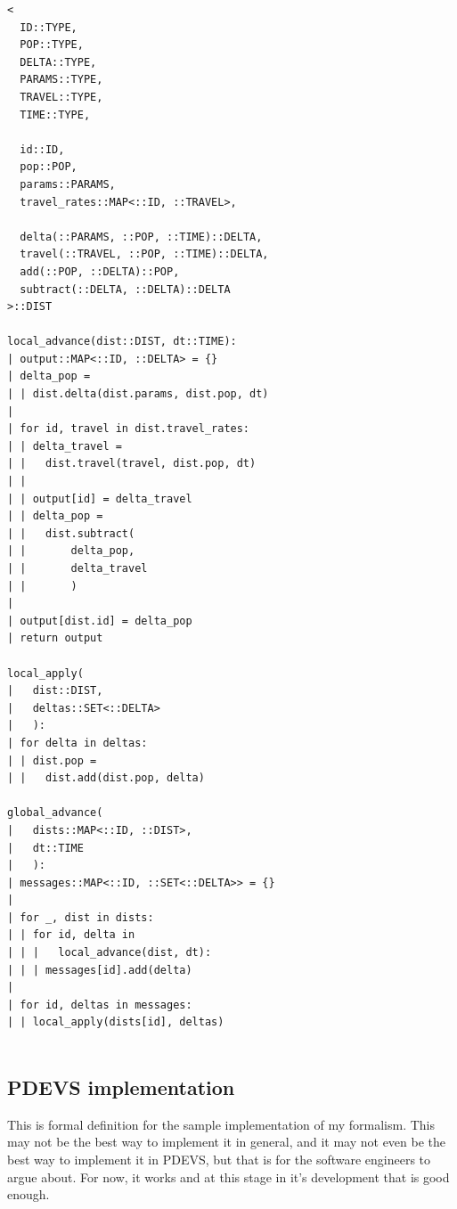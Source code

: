 \documentclass[twocolumn]{article}
\begin{document}
\begin{verbatim}
<
  ID::TYPE, 
  POP::TYPE, 
  DELTA::TYPE, 
  PARAMS::TYPE, 
  TRAVEL::TYPE, 
  TIME::TYPE,
  
  id::ID, 
  pop::POP, 
  params::PARAMS, 
  travel_rates::MAP<::ID, ::TRAVEL>, 
  
  delta(::PARAMS, ::POP, ::TIME)::DELTA, 
  travel(::TRAVEL, ::POP, ::TIME)::DELTA, 
  add(::POP, ::DELTA)::POP, 
  subtract(::DELTA, ::DELTA)::DELTA
>::DIST

local_advance(dist::DIST, dt::TIME):
| output::MAP<::ID, ::DELTA> = {}
| delta_pop = 
| | dist.delta(dist.params, dist.pop, dt)
| 
| for id, travel in dist.travel_rates:
| | delta_travel = 
| |   dist.travel(travel, dist.pop, dt)
| | 
| | output[id] = delta_travel
| | delta_pop = 
| |   dist.subtract(
| |       delta_pop, 
| |       delta_travel
| |       )
| 
| output[dist.id] = delta_pop
| return output
  
local_apply(
|   dist::DIST, 
|   deltas::SET<::DELTA>
|   ):
| for delta in deltas:
| | dist.pop = 
| |   dist.add(dist.pop, delta)

global_advance(
|   dists::MAP<::ID, ::DIST>, 
|   dt::TIME
|   ):
| messages::MAP<::ID, ::SET<::DELTA>> = {}
| 
| for _, dist in dists:
| | for id, delta in 
| | |   local_advance(dist, dt):
| | | messages[id].add(delta)
| 
| for id, deltas in messages:
| | local_apply(dists[id], deltas)
 
\end{verbatim}

\subsection{PDEVS implementation}

This is formal definition for the sample implementation of my formalism. This may not be the best way to implement it in general, and it may not even be the best way to implement it in PDEVS, but that is for the software engineers to argue about. For now, it works and at this stage in it's development that is good enough.
\end{document}
